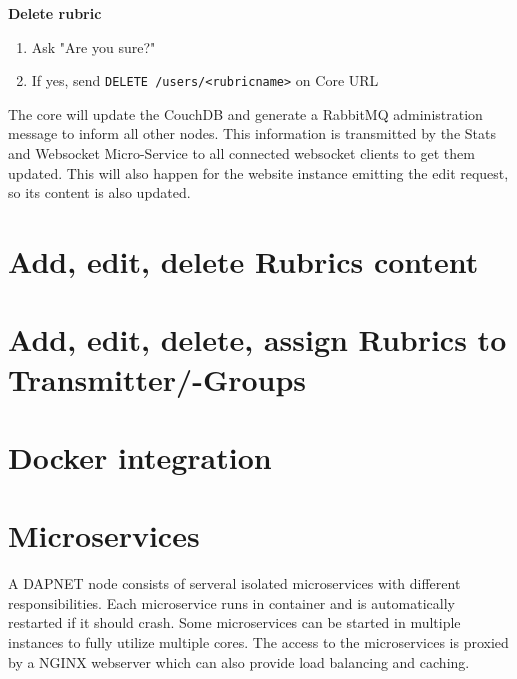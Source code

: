 \textbf{Delete rubric}
\begin{enumerate}
\item Ask "Are you sure?"
\item If yes, send \texttt{DELETE /users/<rubricname>} on Core URL
\end{enumerate}

The core will update the CouchDB and generate a RabbitMQ administration message
to inform all other nodes. This information is transmitted by the Stats and
Websocket Micro-Service to all connected websocket clients to get them updated.
This will also happen for the website instance emitting the edit request, so its
content is also updated.

\section{Add, edit, delete Rubrics content}

\section{Add, edit, delete, assign Rubrics to Transmitter/-Groups}

\section{Docker integration}
\label{internalprog:docker}

\section{Microservices}
\label{internalprog:microservices}

A DAPNET node consists of serveral isolated microservices with different
responsibilities. Each microservice runs in container and is automatically
restarted if it should crash. Some microservices can be started in multiple
instances to fully utilize multiple cores. The access to the microservices is
proxied by a NGINX webserver which can also provide load balancing and caching.

